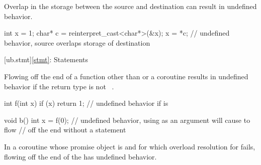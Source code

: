 \pnum
Overlap in the storage between the source and destination
can result in undefined behavior.

\pnum
\begin{example}
\begin{codeblock}
int x = 1;
char* c = reinterpret_cast<char*>(&x);
x = *c;         // undefined behavior, source overlaps storage of destination
\end{codeblock}
\end{example}

[ub.stmt]{\ref*{stmt}: Statements}


\pnum
Flowing off the end of a function other
than  or a coroutine results in undefined behavior if the return type
is not \cv{}~.

\pnum
\begin{example}
\begin{codeblock}
int f(int x) {
  if (x)
    return 1;
  // undefined behavior if  is 
}

void b() {
  int x = f(0); // undefined behavior, using  as an argument will cause  to flow
                // off the end without a  statement
}
\end{codeblock}
\end{example}

\pnum
In a coroutine whose promise object is 
and for which overload resolution for  fails,
flowing off the end of the 
has undefined behavior.

